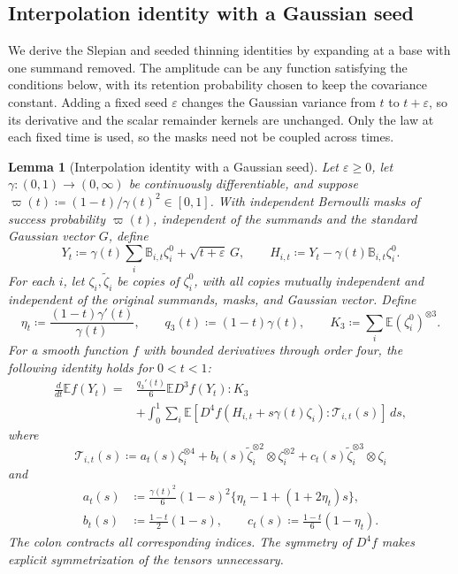 \documentclass[11pt,letterpaper]{article}
\newtheorem{lemma}{Lemma}
\theoremstyle{remark}
\newcommand{\E}{\mathbb E}
\newcommand{\dd}{\,d}
\begin{document}
\subsection{Interpolation identity with a Gaussian seed}
\label{appx-an:sec:path}

We derive the Slepian and seeded thinning identities by expanding at
a base with one summand removed. The amplitude can be any function
satisfying the conditions below, with its retention probability chosen
to keep the covariance constant. Adding a fixed seed \(\varepsilon\)
changes the Gaussian variance from \(t\) to \(t+\varepsilon\),
so its derivative and the scalar remainder kernels are unchanged.
Only the law at each fixed time is used, so the masks need not be
coupled across times.

\begin{lemma}[Interpolation identity with a Gaussian seed]
\label{appx-an:lem:identity}
Let \(\varepsilon\ge0\), let \(\gamma:(0,1)\to(0,\infty)\) be
continuously differentiable, and suppose
\(\varpi(t)\coloneqq(1-t)/\gamma(t)^2\in[0,1]\). With independent
Bernoulli masks of success probability \(\varpi(t)\), independent
of the summands and the standard Gaussian vector \(G\), define
\begin{equation}
 Y_t\coloneqq\gamma(t)\sum_i\mathbb B_{i,t}\zeta_i^0
                    +\sqrt{t+\varepsilon}\,G,\qquad
 H_{i,t}\coloneqq Y_t-\gamma(t)\mathbb B_{i,t}\zeta_i^0.
 \label{eq:interpolation-family}
\end{equation}
For each \(i\), let \(\zeta_i,\widetilde\zeta_i\) be copies of
\(\zeta_i^0\), with all copies mutually independent and independent
of the original summands, masks, and Gaussian vector. {Define}
\[
 \eta_t\coloneqq\frac{(1-t)\gamma'(t)}{\gamma(t)},\qquad
 q_3(t)\coloneqq(1-t)\gamma(t),\qquad
 K_3\coloneqq\sum_i\E(\zeta_i^0)^{\otimes3}.
\]
For a smooth function \(f\) with bounded derivatives through order
four, the following identity holds for \(0<t<1\):
\begin{equation}
 \begin{aligned}
 \frac{d}{dt}\E f(Y_t)
 ={}&\frac{q_3'(t)}6\E D^3f(Y_t):K_3\\
 &+\int_0^1\sum_i\E\!\left[
       D^4f(H_{i,t}+s\gamma(t)\zeta_i):\mathcal T_{i,t}(s)
     \right]\dd s,
 \end{aligned}
 \label{appx-an:fourth-identity}
\end{equation}
where
\[
 \mathcal T_{i,t}(s)\coloneqq
 a_t(s)\zeta_i^{\otimes4}
 +b_t(s)\widetilde\zeta_i^{\otimes2}\otimes\zeta_i^{\otimes2}
 +c_t(s)\widetilde\zeta_i^{\otimes3}\otimes\zeta_i
\]
and
\begin{equation}
 \begin{aligned}
 a_t(s)&\coloneqq\frac{\gamma(t)^2}{6}(1-s)^2
                   \{\eta_t-1+(1+2\eta_t)s\},\\
 b_t(s)&\coloneqq\frac{1-t}{2}(1-s),\qquad
 c_t(s)\coloneqq\frac{1-t}{6}(1-\eta_t).
 \end{aligned}
 \label{appx-an:kernel}
\end{equation}
The colon contracts all corresponding indices. The symmetry of
\(D^4f\) makes explicit symmetrization of the tensors unnecessary.
\end{lemma}
\end{document}
